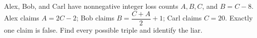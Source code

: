 Alex, Bob, and Carl have nonnegative integer loss counts $A,B,C$, and $B=C-8$. Alex claims $A=2C-2$; Bob claims $B=\dfrac{C+A}{2}+1$; Carl claims $C=20$. Exactly one claim is false. Find every possible triple and identify the liar.

